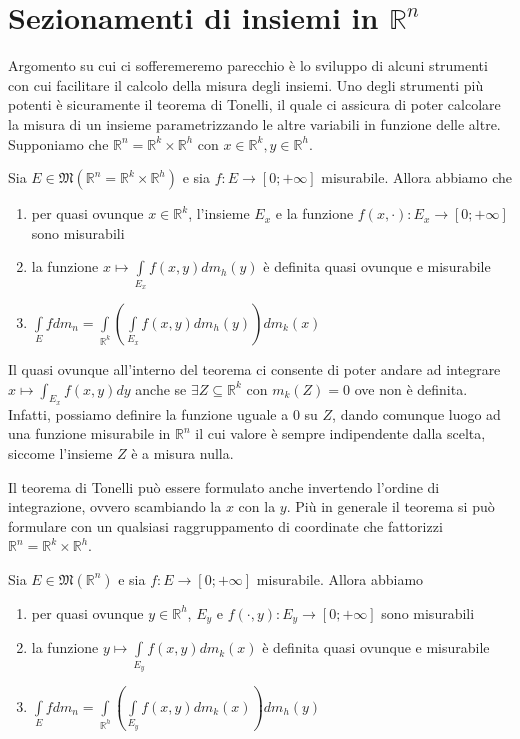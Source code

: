 \section{Sezionamenti di insiemi in $\mathbb{R}^n$}
Argomento su cui ci sofferemeremo parecchio è lo sviluppo di alcuni strumenti con cui facilitare il calcolo della misura degli insiemi. Uno degli strumenti
più potenti è sicuramente il teorema di Tonelli, il quale ci assicura di poter calcolare la misura di un insieme parametrizzando le altre variabili in funzione delle altre. \\
Supponiamo che $\mathbb{R}^n = \mathbb{R}^k \times \mathbb{R}^h$ con $x \in \mathbb{R}^k, y \in \mathbb{R}^h$.
\begin{theorem}[di Tonelli]
	Sia $E \in \mathfrak{M}(\mathbb{R}^n = \mathbb{R}^k \times \mathbb{R}^h)$ e sia $f: E \to [0; +\infty]$ misurabile. Allora abbiamo che
	\begin{enumerate}[label=\protect\circled{\arabic*}]
		\item per quasi ovunque $x \in \mathbb{R}^k$, l'insieme $E_x$ e la funzione $f(x, \cdot): E_x \to [0; +\infty]$ sono misurabili
		\item la funzione $x \mapsto \int\limits_{E_x} f(x, y)dm_h(y)$ è definita quasi ovunque e misurabile
		\item $\int\limits_E f dm_n = \int\limits_{\mathbb{R}^k}(\int\limits_{E_x} f(x, y)dm_h(y))dm_k(x)$ 
	\end{enumerate}
\end{theorem}
\begin{remark}
	Il quasi ovunque all'interno del teorema ci consente di poter andare ad integrare $x \mapsto \int_{E_x} f(x, y)dy$ anche se $\exists Z \subseteq \mathbb{R}^k$ con $m_k(Z) = 0$ ove non è definita. Infatti,
	possiamo definire la funzione uguale a $0$ su $Z$, dando comunque luogo ad una funzione misurabile in $\mathbb{R}^n$ il cui valore è sempre indipendente dalla scelta, siccome l'insieme $Z$ è a misura nulla.
\end{remark}
\begin{remark}
	Il teorema di Tonelli può essere formulato anche invertendo l'ordine di integrazione, ovvero scambiando la $x$ con la $y$. Più in generale il teorema si può formulare con un qualsiasi raggruppamento di coordinate che fattorizzi
	$\mathbb{R}^n = \mathbb{R}^k \times \mathbb{R}^h$.
\end{remark}
\begin{theorem}
	Sia $E \in \mathfrak{M}(\mathbb{R}^n)$ e sia $f: E \to [0; +\infty]$ misurabile. Allora abbiamo
	\begin{enumerate}[label=\protect\circled{\arabic*}]
		\item per quasi ovunque $y \in \mathbb{R}^h$, $E_y$ e $f(\cdot, y): E_y \to [0; +\infty]$ sono misurabili
		\item la funzione $y \mapsto \int\limits_{E_y} f(x, y)dm_k(x)$ è definita quasi ovunque e misurabile
		\item $\int\limits_E f dm_n = \int\limits_{\mathbb{R}^h} (\int\limits_{E_y} f(x, y) dm_k(x)) dm_h(y)$
	\end{enumerate}
\end{theorem}
